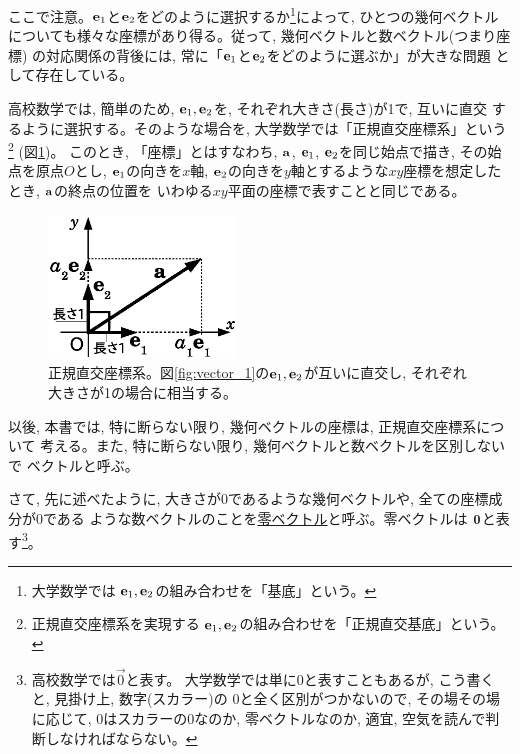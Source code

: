 ここで注意。${\bf e}_1$と${\bf e}_2$をどのように選択するか\footnote{大学数学では
${\bf e}_1, {\bf e}_2$の組み合わせを「基底」という。}によって, 
ひとつの幾何ベクトルについても様々な座標があり得る。従って, 幾何ベクトルと数ベクトル(つまり座標)
の対応関係の背後には, 常に「${\bf e}_1$と${\bf e}_2$をどのように選ぶか」が大きな問題
として存在している。

高校数学では, 簡単のため, ${\bf e}_1, {\bf e}_2$を, それぞれ大きさ(長さ)が1で, 互いに直交
するように選択する。そのような場合を, 大学数学では「正規直交座標系」という
\footnote{正規直交座標系を実現する
${\bf e}_1, {\bf e}_2$の組み合わせを「正規直交基底」という。} (図\ref{fig:vector_2})。
このとき, 「座標」とはすなわち, ${\bf a}$, ${\bf e}_1$, ${\bf e}_2$を同じ始点で描き, 
その始点を原点$O$とし, ${\bf e}_1$の向きを$x$軸, 
${\bf e}_2$の向きを$y$軸とするような$xy$座標を想定したとき, ${\bf a}$の終点の位置を
いわゆる$xy$平面の座標で表すことと同じである。

\begin{figure}
    \centering
    \includegraphics[width=5cm]{vector_2.eps}
    \caption{正規直交座標系。図\ref{fig:vector_1}の${\bf e}_1, {\bf e}_2$が互いに直交し, それぞれ大きさが1の場合に相当する。\label{fig:vector_2}}
\end{figure}

以後, 本書では, 特に断らない限り, 幾何ベクトルの座標は, 正規直交座標系について
考える。また, 特に断らない限り, 幾何ベクトルと数ベクトルを区別しないで
ベクトルと呼ぶ。


さて, 先に述べたように, 大きさが0であるような幾何ベクトルや, 全ての座標成分が0である
ような数ベクトルのことを\underline{零ベクトル}と呼ぶ。零ベクトルは
${\bf 0}$と表す\footnote{高校数学では$\vec{0}$と表す。
大学数学では単に0と表すこともあるが, こう書くと, 見掛け上, 数字(スカラー)の
0と全く区別がつかないので, その場その場に応じて, 
0はスカラーの0なのか, 零ベクトルなのか, 適宜, 空気を読んで判断しなければならない。}。




